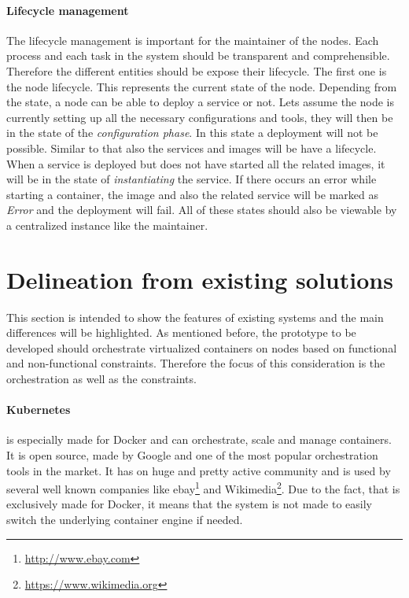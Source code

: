 \paragraph{Lifecycle management}
The lifecycle management is important for the maintainer of the nodes.
Each process and each task in the system should be transparent and comprehensible.
Therefore the different entities should be expose their lifecycle.
The first one is the node lifecycle.
This represents the current state of the node.
Depending from the state, a node can be able to deploy a service or not.
Lets assume the node is currently setting up all the necessary configurations and tools, they will then be in the state of the \textit{configuration phase}.
In this state a deployment will not be possible.
Similar to that also the services and images will be have a lifecycle.
When a service is deployed but does not have started all the related images, it will be in the state of \textit{instantiating} the service.
If there occurs an error while starting a container, the image and also the related service will be marked as \textit{Error} and the deployment will fail.
All of these states should also be viewable by a centralized instance like the maintainer.


\section{Delineation from existing solutions}
\label{section:delineation-from-existing-solutions}
This section is intended to show the features of existing systems and the main differences will be highlighted.
As mentioned before, the prototype to be developed should orchestrate virtualized containers on nodes based on functional and non-functional constraints.
Therefore the focus of this consideration is the orchestration as well as the constraints.

\paragraph{Kubernetes} is especially made for Docker and can orchestrate, scale and manage containers.
It is open source, made by Google and one of the most popular orchestration tools in the market.
It has on huge and pretty active community and is used by several well known companies\autocite{Kubernetes:Case-Studies} like ebay\footnote{\url{http://www.ebay.com}} and Wikimedia\footnote{\url{https://www.wikimedia.org}}.
Due to the fact, that is exclusively made for Docker, it means that the system is not made to easily switch the underlying container engine if needed.


